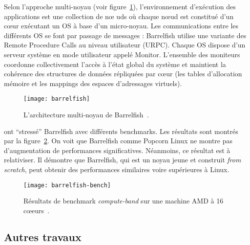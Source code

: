       Selon l’approche multi-noyau (voir figure~\ref{fig:barrelfish}),
      l'environnement d’exécution des applications est une collection de n\oe
      uds où chaque n\oe ud est constitué d’un c\oe ur exécutant un OS à base
      d’un micro-noyau. Les communications entre les différents OS se font par
      passage de messages : Barrelfish utilise une variante des Remote Procedure
      Calls au niveau utilisateur (URPC). Chaque OS dispose d’un serveur système
      en mode utilisateur appelé Monitor. L’ensemble des moniteurs coordonne
      collectivement l’accès à l’état global du système et maintient la
      cohérence des structures de données répliquées par c\oe ur (les tables
      d’allocation mémoire et les mappings des espaces d’adressages virtuels).\\

      \begin{figure}[ht]
        \centering \texttt{[image: barrelfish]}
        \caption{L'architecture multi-noyau de
          Barrelfish~\citep{baumann2009multikernel}.}
        \label{fig:barrelfish}
      \end{figure}

      \citeauthor{baumann2009multikernel} ont ``stressé'' Barrelfish avec
      différents benchmarks. Les résultats sont montrés par la
      figure~\ref{fig:barrelfish-bench}. On voit que Barrelfish comme Popcorn
      Linux ne montre pas d'augmentation de performances
      significatives. Néanmoins, ce résultat est à relativiser. Il démontre que
      Barrelfish, qui est un noyau jeune et construit \textit{from scratch},
      peut obtenir des performances similaires voire supérieures à Linux.

      \begin{figure}[ht]
        \centering
        \texttt{[image: barrelfish-bench]}
        \caption{Résultats de benchmark \textit{compute-band} sur une machine
          AMD à 16 c\oe eurs~\citep{baumann2009multikernel}.}
        \label{fig:barrelfish-bench}
      \end{figure}

    \subsection{Autres travaux}
    \label{subsec:others}
    
